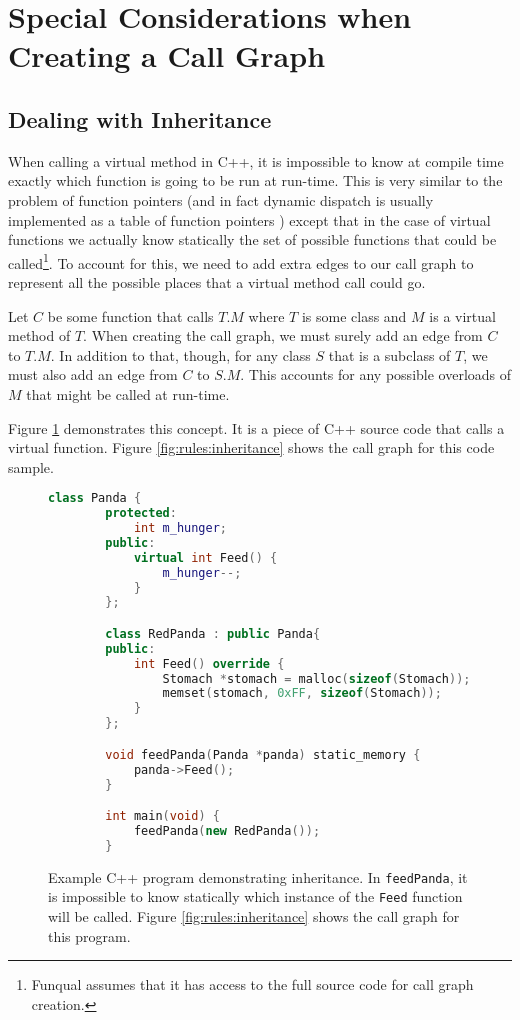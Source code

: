 \section{Special Considerations when Creating a Call Graph}\label{sec:rules:special}

\subsection{Dealing with Inheritance}\label{sec:rules:inherit}

When calling a virtual method in C++, it is impossible to know at compile time exactly which function is going to be run at run-time.  This is very similar to the problem of function pointers (and in fact dynamic dispatch is usually implemented as a table of function pointers \cite{language-standard}) except that in the case of virtual functions we actually know statically the set of possible functions that could be called\footnote{Funqual assumes that it has access to the full source code for call graph creation.}.  To account for this, we need to add extra edges to our call graph to represent all the possible places that a virtual method call could go.  

Let $C$ be some function that calls $T.M$ where $T$ is some class and $M$ is a virtual method of $T$.  When creating the call graph, we must surely add an edge from $C$ to $T.M$.  In addition to that, though, for any class $S$ that is a subclass of $T$, we must also add an edge from $C$ to $S.M$.  This accounts for any possible overloads of $M$ that might be called at run-time.

Figure \ref{lst:rules:inheritance} demonstrates this concept.  It is a piece of C++ source code that calls a virtual function.  Figure \ref{fig:rules:inheritance} shows the call graph for this code sample.  

\begin{figure}
    \begin{lstlisting}[language=C++,gobble=8]
        class Panda {
        protected:
            int m_hunger;
        public:
            virtual int Feed() {
                m_hunger--;
            }
        };

        class RedPanda : public Panda{
        public:
            int Feed() override {
                Stomach *stomach = malloc(sizeof(Stomach));
                memset(stomach, 0xFF, sizeof(Stomach));
            }
        };

        void feedPanda(Panda *panda) static_memory {
            panda->Feed();
        }

        int main(void) {
            feedPanda(new RedPanda());
        }
    \end{lstlisting}
    \caption{Example C++ program demonstrating inheritance.  In \lstinline{feedPanda}, it is impossible to know statically which instance of the \lstinline{Feed} function will be called.  Figure \ref{fig:rules:inheritance} shows the call graph for this program.}
    \label{lst:rules:inheritance}
\end{figure}

